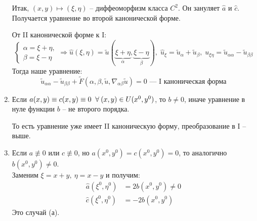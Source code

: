\documentclass[../main.tex]{subfiles}
\begin{document}
\begin{enumerate}[label=\asbuk*),ref=\asbuk*]
Итак, $(x,y) \mapsto (\xi,\eta)$ -- диффеоморфизм класса $C^2$. Он зануляет $\hat{a}$ и $\hat{c}$. Получается уравнение во второй канонической форме.
\begin{remark} 
От II канонической форме к I:
\begin{equation*}
	\begin{cases}
		\alpha = \xi + \eta, \\
		\beta = \xi - \eta
	\end{cases} \Rightarrow
	\hat{u}(\xi, \eta) = \tilde{u}(\underbrace{\xi + \eta}_{\alpha}, \underbrace{\xi - \eta}_{\beta}),\; \hat{u}_{\xi} = \tilde{u}_{\alpha} +\tilde{u}_{\beta},\; u_{\xi \eta} = \tilde{u}_{\alpha \alpha} - \tilde{u}_{\beta \beta}
\end{equation*}
Тогда наше уравнение: 
\begin{equation*}
	\tilde{u}_{\alpha \alpha} - \tilde{u}_{\beta \beta} + \tilde{F}(\alpha, \beta, \tilde{u}, \nabla_{\alpha \beta}\tilde{u}) = 0 \text{ --- I каноническая форма}
\end{equation*}
\end{remark}
\item Если $a(x, y) \equiv c(x, y) \equiv 0 \;\;\forall\: (x, y) \in U(x^0, y^0)$, то $b \neq 0$, иначе уравнение в нуле функции $b$ -- не второго порядка.

То есть уравнение уже имеет II каноническую форму, преобразование в I -- выше. 
\item Если $a \not\equiv 0$ или $c \not\equiv 0$, но $a(x^0, y^0) = c(x^0, y^0) = 0$, то аналогично $b(x^0, y^0) \neq 0$. \\
Заменим $\xi = x + y,\ \eta = x - y$ и получим:
$$
\begin{aligned}
\hat{a}(\xi^0, \eta^0) &= 2b(x^0, y^0) \neq 0 \\
\hat{c}(\xi^0, \eta^0) &= -2b(x^0, y^0)
\end{aligned}
$$
Это случай (а).
\end{enumerate}
\end{document}
